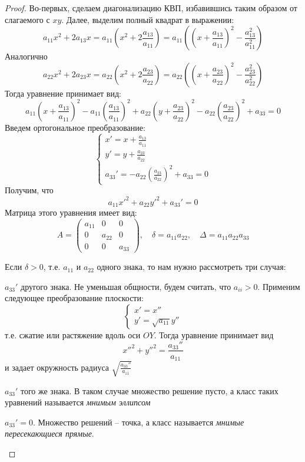 \begin{proof}
	Во-первых, сделаем диагонализацию КВП, избавившись таким образом от слагаемого с $xy$.
	Далее, выделим полный квадрат в выражении:
	\[a_{11} x^2 + 2a_{13} x = a_{11} \left(x^2 + 2 \frac{a_{13}}{a_{11}}\right) = a_{11} \left(\left(x + \frac{a_{13}}{a_{11}}\right)^2 - \frac{a_{13}^2}{a_{11}^2}\right)\]
	Аналогично
	\[a_{22} x^2 + 2a_{23} x = a_{22} \left(x^2 + 2 \frac{a_{23}}{a_{22}}\right) = a_{22} \left(\left(x + \frac{a_{23}}{a_{22}}\right)^2 - \frac{a_{23}^2}{a_{22}^2}\right)\]
	Тогда уравнение принимает вид:
	\[a_{11} \left(x + \frac{a_{13}}{a_{11}}\right)^2 - a_{11} \left(\frac{a_{13}}{a_{11}}\right)^2 + a_{22} \left(y + \frac{a_{23}}{a_{22}}\right)^2 - a_{22} \left(\frac{a_{23}}{a_{22}}\right)^2 + a_{33} = 0\]
	Введем ортогональное преобразование:
	\[\begin{cases}
		x' = x + \frac{a_{13}}{a_{11}} \\
		y' = y + \frac{a_{23}}{a_{22}} \\
		a_{33}' = -a_{22} \left(\frac{a_{23}}{a_{22}}\right)^2 + a_{33} = 0
	\end{cases}\]
	Получим, что
	\[a_{11} x'^2 + a_{22} y'^2 + a_{33}' = 0\]
	Матрица этого уравнения имеет вид:
	\[A = \left(\begin{array}{ccc}
	a_{11} & 0 & 0 \\ 
	0 & a_{22} & 0 \\ 
	0 & 0 & a_{33}
	\end{array}\right), \quad \delta = a_{11} a_{22}, \quad \Delta = a_{11} a_{22} a_{33}\]

	Если $\delta > 0$, т.е. $a_{11}$ и $a_{22}$ одного знака, то нам нужно рассмотреть три случая:
	\begin{MyList}
		\item $a_{33}'$ другого знака.
		Не уменьшая общности, будем считать, что $a_{ii} > 0$. Применим следующее преобразование плоскости:
		\[\begin{cases}
			x' = x'' \\
			y' = \sqrt{a_{11}} y''
		\end{cases}\]
		т.е. сжатие или растяжение вдоль оси $OY$.
		Тогда уравнение принимает вид
		\[x''^2 + y''^2 = \frac{a_{33}''}{a_{11}}\]
		и задает окружность радиуса $\sqrt{ \frac{a_{33}''}{a_{11}}}$ 
		\begin{figure}[H]
			\centering
			\def\svgwidth{.35\columnwidth}
			
		\end{figure}
		\item $a_{33}'$ того же знака. В таком случае множество решение пусто, а класс таких уравнений называется \textit{мнимым эллипсом}
		\item $a_{33}' = 0$.  Множество решений -- точка, а класс называется \textit{мнимые пересекающиеся прямые}. 
	\end{MyList}


\end{proof}
